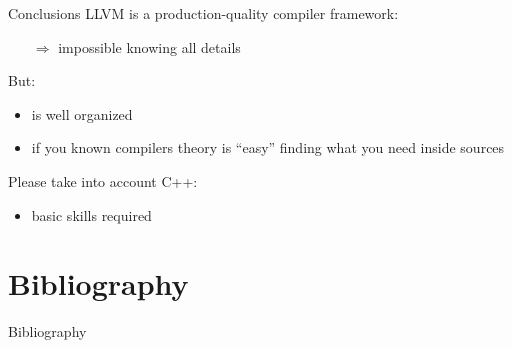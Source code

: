 \documentclass[10pt,mathserif]{beamer}
\begin{document}
\begin{frame}{Conclusions}
	LLVM is a \alert{production-quality} compiler framework:
	\begin{itemize}
		\item[$\Rightarrow$] impossible knowing all details
	\end{itemize}
	
	\vfill
	But:
	\begin{itemize}
		\item is well organized
		\item if you known compilers theory is ``easy'' finding what you need inside sources
	\end{itemize}
	
	\vfill
	Please take into account C++:
	\begin{itemize}
		\item basic skills required
	\end{itemize}
\end{frame}


\section*{Bibliography}
\begin{frame}[allowframebreaks]{Bibliography}
\nocite{*}


\end{frame}
\end{document}

